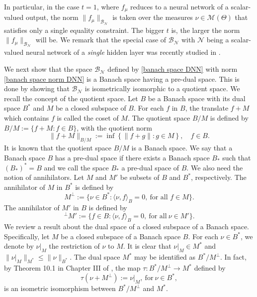 \documentclass[11pt]{article}
\begin{document}
In particular, in the case $t=1$, where $f_\mu$ reduces to a neural network of a scalar-valued output, the norm $ \|f_\mu\|_{\mathcal{B}_{\mathcal{N}}}$ is taken over the measures $\nu\in\mathcal{M}(\Theta)$ that satisfies only a single equality constraint. The bigger $t$ is, the larger the norm $ \|f_\mu\|_{\mathcal{B}_{\mathcal{N}}}$ will be. We remark that the special case of $\mathcal{B}_{\mathcal{N}}$ with $\mathcal{N}$ being a scalar-valued neural network of a {\it single} hidden layer was recently studied in \cite{bartolucci2023understanding}.

%


We next show that the space $\mathcal{B}_{\mathcal{N}}$ defined by \eqref{banach space DNN} with norm \eqref{banach space norm DNN} is a Banach space having a pre-dual space. This is done by showing that   $\mathcal{B}_{\mathcal{N}}$ is isometrically isomorphic to a quotient space. We recall the concept of the quotient space. Let $B$ be a Banach space with its dual space $B^*$ and $M$ be a closed subspace of $B$. For each $f$ in $B$, the translate $f+M$ which contains $f$ is called the coset of $M$.  The quotient space $B/M$ is defined by  $B/M:=\{f+M: f\in B\}$, with the quotient norm 
\begin{equation*}
    \|f+M\|_{B/M}:=\inf\left\{\|f+g\|:g\in M\right\},\quad f\in B.
\end{equation*}
It is known \cite{megginson2012introduction} that the quotient space $B/M$ is a Banach space. We say that a Banach space $B$ has a pre-dual space if there exists a Banach space $B_*$ such that $(B_*)^*=B$ and we call the space  $B_*$ a pre-dual space of $B$. 
%
%
%
%
%
We also need the notion of annihilators. Let $M$ and
$M'$ be subsets of $B$ and $B^*$, respectively. The annihilator of $M$ in $B^*$ is defined by 
$$
M^\perp:=\{\nu\in B^*:\langle\nu,f\rangle_{B}=0, \ \text{for all }f\in M\}.
$$
The annihilator of $M'$ in $B$ is defined by
$$
^{\perp}M':=\{f\in B: \langle\nu,f\rangle_{B}=0,
\ \mbox{for all}\  \nu\in M'\}.
$$  
We review a result about the dual space of a closed subspace of a Banach space. Specifically, let $M$ be a closed subspace of a Banach space $B$. For each $\nu\in B^*$, we denote by $\nu|_{M}$ the restriction of $\nu$ to $M$. It is clear that $\nu|_{M}\in M^*$ and $\|\nu|_{M}\|_{M^*}\leq\|\nu\|_{B^*}$. The dual space $M^*$ may be identified as $B^*/M^\perp$. In fact, by Theorem 10.1 in Chapter III of \cite{conway2019course}, the map $\tau:B^*/M^\perp\to M^*$ defined by 
$$
\tau(\nu+M^\perp):=\nu|_{M}, \ \mbox{for}\ \nu\in B^*,
$$ 
is an isometric isomorphism between $B^*/M^\perp$ and $M^*$.
\end{document}
